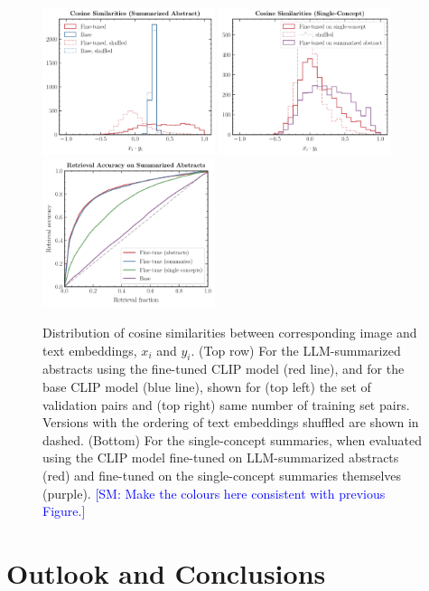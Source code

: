 \documentclass[10pt]{article} %
\newcommand{\SM}[1]{\textcolor{blue}{[SM: #1]}}
\begin{document}
\begin{figure}[!h]
\includegraphics[width=0.45\textwidth]{plots/sim_val.pdf}
\includegraphics[width=0.45\textwidth]{plots/sim_summ1.pdf}
\centering\includegraphics[width=0.45\textwidth]{plots/retrieval.pdf}
\caption{Distribution of cosine similarities between corresponding image and text embeddings, $x_i$ and $y_i$. (Top row) For the LLM-summarized abstracts using the fine-tuned CLIP model (red line), and for the base CLIP model (blue line), shown for (top left) the set of validation pairs and (top right) same number of training set pairs. Versions with the ordering of text embeddings shuffled are shown in dashed. (Bottom) For the single-concept summaries, when evaluated using the CLIP model fine-tuned on LLM-summarized abstracts (red) and fine-tuned on the single-concept summaries themselves (purple). \SM{Make the colours here consistent with previous Figure.}}
\label{fig:sim_valtrain}
\end{figure}

\section{Outlook and Conclusions}
\label{sec:conclusion}
\end{document}
